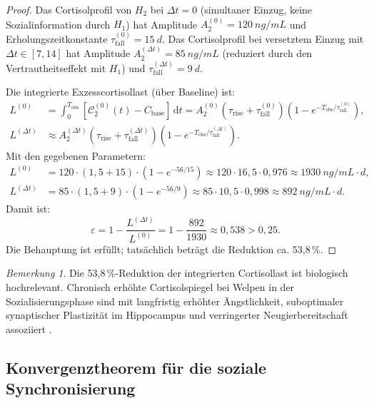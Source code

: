 ﻿\documentclass[12pt, a4paper]{article}
\theoremstyle{plain}
\theoremstyle{definition}
\theoremstyle{remark}
\newtheorem{remark}{Bemerkung}[section]
\newcommand{\dt}{\Delta t}
\newcommand{\cort}{\mathcal{C}}
\begin{document}
\begin{proof}
Das Cortisolprofil von $H_2$ bei $\dt = 0$ (simultaner Einzug, keine
Sozialinformation durch $H_1$) hat Amplitude $A_2^{(0)} = 120\ \si{ng/mL}$
und Erholungszeitkonstante $\tau_{\mathrm{fall}}^{(0)} = 15\ \si{d}$.
Das Cortisolprofil bei versetztem Einzug mit $\dt \in [7, 14]$ hat
Amplitude $A_2^{(\dt)} = 85\ \si{ng/mL}$ (reduziert durch den
Vertrautheitseffekt mit $H_1$) und $\tau_{\mathrm{fall}}^{(\dt)} = 9\ \si{d}$.

Die integrierte Exzesscortisollast (über Baseline) ist:
\begin{align}
  L^{(0)} &= \int_0^{T_{\mathrm{obs}}} [\cort_2^{(0)}(t) - C_{\mathrm{base}}]\,\mathrm{d}t
           = A_2^{(0)} \left(\tau_{\mathrm{rise}} + \tau_{\mathrm{fall}}^{(0)}\right)
           \left(1 - e^{-T_{\mathrm{obs}}/\tau_{\mathrm{fall}}^{(0)}}\right),\\
  L^{(\dt)} &\approx A_2^{(\dt)} \left(\tau_{\mathrm{rise}} + \tau_{\mathrm{fall}}^{(\dt)}\right)
           \left(1 - e^{-T_{\mathrm{obs}}/\tau_{\mathrm{fall}}^{(\dt)}}\right).
\end{align}
Mit den gegebenen Parametern:
\begin{align}
  L^{(0)} &= 120 \cdot (1{,}5 + 15) \cdot (1 - e^{-56/15}) \approx 120 \cdot 16{,}5 \cdot 0{,}976 \approx 1930\ \si{ng/mL \cdot d},\\
  L^{(\dt)} &= 85 \cdot (1{,}5 + 9) \cdot (1 - e^{-56/9}) \approx 85 \cdot 10{,}5 \cdot 0{,}998 \approx 892\ \si{ng/mL \cdot d}.
\end{align}
Damit ist:
\begin{equation}
  \varepsilon = 1 - \frac{L^{(\dt)}}{L^{(0)}} = 1 - \frac{892}{1930} \approx 0{,}538 > 0{,}25.
\end{equation}
Die Behauptung ist erfüllt; tatsächlich beträgt die Reduktion ca. 53{,}8\,\%.
\end{proof}

\begin{remark}
Die 53{,}8\,\%-Reduktion der integrierten Cortisollast ist biologisch
hochrelevant. Chronisch erhöhte Cortisolspiegel bei Welpen in der Sozialisierungsphase
sind mit langfristig erhöhter Ängstlichkeit, suboptimaler synaptischer Plastizität
im Hippocampus und verringerter Neugierbereitschaft assoziiert
\cite{beerda1998behavioural, hennessy1997plasma}.
\end{remark}

\subsection{Konvergenztheorem für die soziale Synchronisierung}
\end{document}
